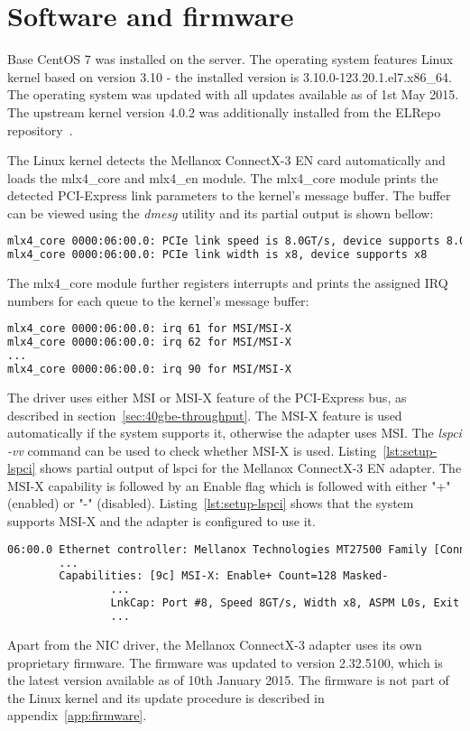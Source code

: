 
\section{Software and firmware}
Base CentOS 7 was installed on the server.
The operating system features Linux kernel based on version 3.10 -
the installed version is 3.10.0-123.20.1.el7.x86\_64.
The operating system was updated with all updates available as of 1st May 2015.
The upstream kernel version 4.0.2 was additionally installed from the ELRepo repository~\cite{elrepo-kernel-ml}.

The Linux kernel detects the Mellanox ConnectX-3 EN card automatically and loads the mlx4\_core and mlx4\_en module.
The mlx4\_core module prints the detected PCI-Express link parameters to the kernel's message buffer.
The buffer can be viewed using the {\it{dmesg}} utility and its partial output is shown bellow:
\begin{lstlisting}[language=TeX]
mlx4_core 0000:06:00.0: PCIe link speed is 8.0GT/s, device supports 8.0GT/s
mlx4_core 0000:06:00.0: PCIe link width is x8, device supports x8
\end{lstlisting}
The mlx4\_core module further registers interrupts and prints the assigned IRQ numbers for each queue
to the kernel's message buffer:
\begin{lstlisting}[language=TeX]
mlx4_core 0000:06:00.0: irq 61 for MSI/MSI-X
mlx4_core 0000:06:00.0: irq 62 for MSI/MSI-X
...
mlx4_core 0000:06:00.0: irq 90 for MSI/MSI-X
\end{lstlisting}

The driver uses either MSI or MSI-X feature of the PCI-Express bus, as described in section~\ref{sec:40gbe-throughput}.
The MSI-X feature is used automatically if the system supports it, otherwise the adapter uses MSI.
The {\it{lspci -vv}} command can be used to check whether MSI-X is used.
Listing~\ref{lst:setup-lspci} shows partial output of lspci for the Mellanox ConnectX-3 EN adapter.
The MSI-X capability is followed by an Enable flag which is followed with either "+" (enabled)
or "-" (disabled).
Listing~\ref{lst:setup-lspci} shows that the system supports MSI-X and the adapter is configured to use it.
\begin{lstlisting}[language=TeX,label={lst:setup-lspci},caption={Partial output of lspci -vv for Mellanox ConnectX-3 EN}]
06:00.0 Ethernet controller: Mellanox Technologies MT27500 Family [ConnectX-3]
		...
		Capabilities: [9c] MSI-X: Enable+ Count=128 Masked-
				...
				LnkCap: Port #8, Speed 8GT/s, Width x8, ASPM L0s, Exit Latency L0s unlimited, L1 unlimited
				...
\end{lstlisting}

Apart from the NIC driver, the Mellanox ConnectX-3 adapter uses its own proprietary firmware.
The firmware was updated to version 2.32.5100, which is the latest version available as of 10th January 2015.
The firmware is not part of the Linux kernel and its update procedure is described in appendix~\ref{app:firmware}.
